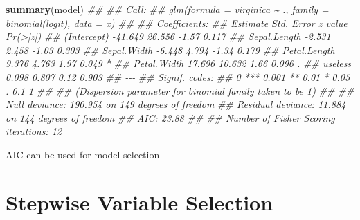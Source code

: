 \documentclass[
  notitlepage]{book}
\newenvironment{Shaded}{\begin{snugshade}}{\end{snugshade}}
\newcommand{\CommentTok}[1]{\textcolor[rgb]{0.56,0.35,0.01}{\textit{#1}}}
\newcommand{\KeywordTok}[1]{\textcolor[rgb]{0.13,0.29,0.53}{\textbf{#1}}}
\newcommand{\NormalTok}[1]{#1}
\begin{document}
\begin{Shaded}
\begin{Highlighting}[]
\KeywordTok{summary}\NormalTok{(model)}
\CommentTok{\#\# }
\CommentTok{\#\# Call:}
\CommentTok{\#\# glm(formula = virginica \textasciitilde{} ., family = binomial(logit), data = x)}
\CommentTok{\#\# }
\CommentTok{\#\# Coefficients:}
\CommentTok{\#\#              Estimate Std. Error z value Pr(\textgreater{}|z|)  }
\CommentTok{\#\# (Intercept)   {-}41.649     26.556   {-}1.57    0.117  }
\CommentTok{\#\# Sepal.Length   {-}2.531      2.458   {-}1.03    0.303  }
\CommentTok{\#\# Sepal.Width    {-}6.448      4.794   {-}1.34    0.179  }
\CommentTok{\#\# Petal.Length    9.376      4.763    1.97    0.049 *}
\CommentTok{\#\# Petal.Width    17.696     10.632    1.66    0.096 .}
\CommentTok{\#\# useless         0.098      0.807    0.12    0.903  }
\CommentTok{\#\# {-}{-}{-}}
\CommentTok{\#\# Signif. codes:  }
\CommentTok{\#\# 0 \textquotesingle{}***\textquotesingle{} 0.001 \textquotesingle{}**\textquotesingle{} 0.01 \textquotesingle{}*\textquotesingle{} 0.05 \textquotesingle{}.\textquotesingle{} 0.1 \textquotesingle{} \textquotesingle{} 1}
\CommentTok{\#\# }
\CommentTok{\#\# (Dispersion parameter for binomial family taken to be 1)}
\CommentTok{\#\# }
\CommentTok{\#\#     Null deviance: 190.954  on 149  degrees of freedom}
\CommentTok{\#\# Residual deviance:  11.884  on 144  degrees of freedom}
\CommentTok{\#\# AIC: 23.88}
\CommentTok{\#\# }
\CommentTok{\#\# Number of Fisher Scoring iterations: 12}
\end{Highlighting}
\end{Shaded}

AIC can be used for model selection

\hypertarget{stepwise-variable-selection-1}{%
\section{Stepwise Variable Selection}\label{stepwise-variable-selection-1}}
\end{document}
